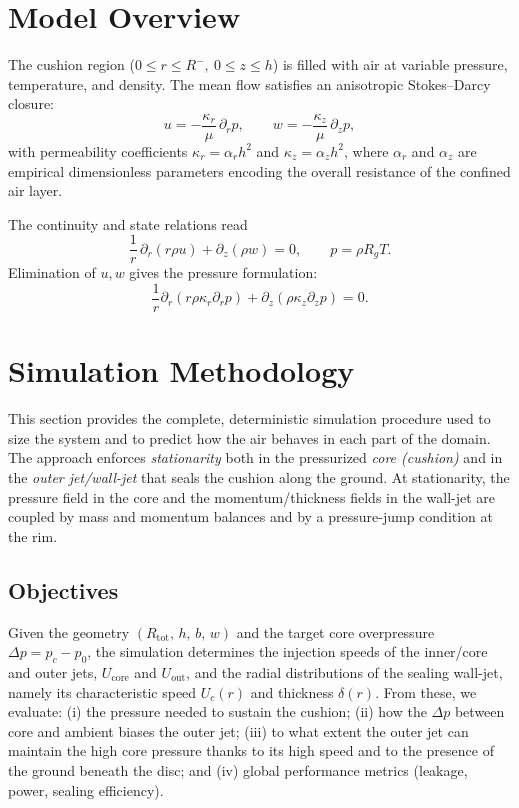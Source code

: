 \documentclass[11pt,a4paper]{article}
\begin{document}
\section{Model Overview}
\label{sec:model-overview}

The cushion region ($0\le r\le R^{-},\ 0\le z\le h$) is filled with air at variable pressure, temperature, and density.
The mean flow satisfies an anisotropic Stokes--Darcy closure:
\begin{equation}
  u = -\frac{\kappa_r}{\mu}\,\partial_r p,\qquad
  w = -\frac{\kappa_z}{\mu}\,\partial_z p,
\end{equation}
with permeability coefficients $\kappa_r=\alpha_r h^2$ and $\kappa_z=\alpha_z h^2$, where $\alpha_r$ and $\alpha_z$ are empirical dimensionless parameters encoding the overall resistance of the confined air layer.

The continuity and state relations read
\begin{equation}
  \frac{1}{r}\,\partial_r\!\left(r\rho u\right)+\partial_z(\rho w)=0,\qquad
  p=\rho R_g T.
\end{equation}
Elimination of $u,w$ gives the pressure formulation:
\begin{equation}
  \frac{1}{r}\partial_r(r\rho\kappa_r\partial_r p)+\partial_z(\rho\kappa_z\partial_z p)=0.
\end{equation}




\section{Simulation Methodology}
\label{sec:simulation-method}

This section provides the complete, deterministic simulation procedure used to size the system and to predict how the air behaves in each part of the domain. The approach enforces \emph{stationarity} both in the pressurized \emph{core (cushion)} and in the \emph{outer jet/wall-jet} that seals the cushion along the ground. At stationarity, the pressure field in the core and the momentum/thickness fields in the wall-jet are coupled by mass and momentum balances and by a pressure-jump condition at the rim.

\subsection{Objectives}
Given the geometry $(R_{\mathrm{tot}},\, h,\, b,\, w)$ and the target core overpressure $\Delta p=p_c-p_0$, the simulation determines the injection speeds of the inner/core and outer jets, $U_{\mathrm{core}}$ and $U_{\mathrm{out}}$, and the radial distributions of the sealing wall-jet, namely its characteristic speed $U_c(r)$ and thickness $\delta(r)$. From these, we evaluate: (i) the pressure needed to sustain the cushion; (ii) how the $\Delta p$ between core and ambient biases the outer jet; (iii) to what extent the outer jet can maintain the high core pressure thanks to its high speed and to the presence of the ground beneath the disc; and (iv) global performance metrics (leakage, power, sealing efficiency).
\end{document}
